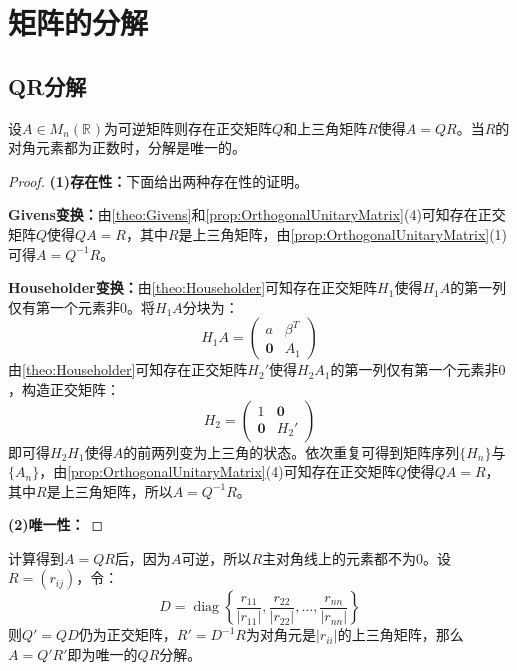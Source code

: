 \section{矩阵的分解}

\subsection{QR分解}
\begin{theorem}\label{theo:QR}
	设$A\in M_{n}(\mathbb{R}^{})$为可逆矩阵则存在正交矩阵$Q$和上三角矩阵$R$使得$A=QR$。当$R$的对角元素都为正数时，分解是唯一的。
\end{theorem}
\begin{proof}
	\textbf{(1)存在性：}下面给出两种存在性的证明。\par
	\textbf{Givens变换：}由\cref{theo:Givens}和\cref{prop:OrthogonalUnitaryMatrix}(4)可知存在正交矩阵$Q$使得$QA=R$，其中$R$是上三角矩阵，由\cref{prop:OrthogonalUnitaryMatrix}(1)可得$A=Q^{-1}R$。\par
	\textbf{Householder变换：}由\cref{theo:Householder}可知存在正交矩阵$H_1$使得$H_1A$的第一列仅有第一个元素非$0$。将$H_1A$分块为：
	\begin{equation*}
		H_1A=
		\begin{pmatrix}
			a & \beta^T \\
			\mathbf{0} & A_1
		\end{pmatrix}
	\end{equation*}
	由\cref{theo:Householder}可知存在正交矩阵$H_2'$使得$H_2A_1$的第一列仅有第一个元素非$0$，构造正交矩阵：
	\begin{equation*}
		H_2=
		\begin{pmatrix}
			1 & \mathbf{0} \\
			\mathbf{0} & H_2'
		\end{pmatrix}
	\end{equation*}
	即可得$H_2H_1$使得$A$的前两列变为上三角的状态。依次重复可得到矩阵序列$\{H_n\}$与$\{A_n\}$，由\cref{prop:OrthogonalUnitaryMatrix}(4)可知存在正交矩阵$Q$使得$QA=R$，其中$R$是上三角矩阵，所以$A=Q^{-1}R$。\par
	\textbf{(2)唯一性：}
\end{proof}
\begin{note}
	计算得到$A=QR$后，因为$A$可逆，所以$R$主对角线上的元素都不为$0$。设$R=(r_{ij})$，令：
	\begin{equation*}
		D=\operatorname{diag}\left\{\frac{r_{11}}{|r_{11}|},\frac{r_{22}}{|r_{22}|},\dots,\frac{r_{nn}}{|r_{nn}|}\right\}
	\end{equation*}
	则$Q'=QD$仍为正交矩阵，$R'=D^{-1}R$为对角元是$|r_{ii}|$的上三角矩阵，那么$A=Q'R'$即为唯一的$QR$分解。
\end{note}

